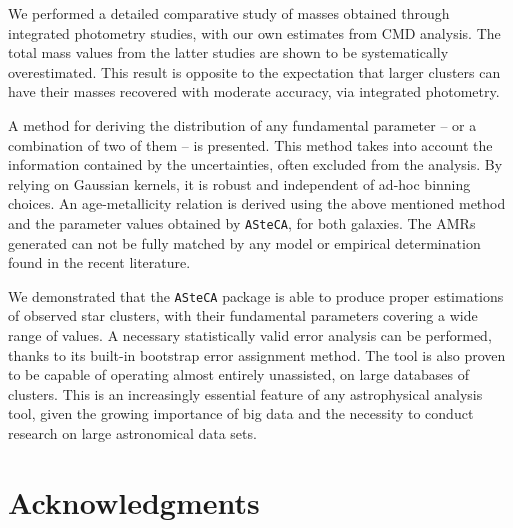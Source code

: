 \documentclass[a4paper,fleqn,usenatbib]{mnras}
\begin{document}
We performed a detailed comparative study of masses obtained through integrated
photometry studies, with our own estimates from CMD analysis. The total mass
values from the latter studies are shown to be systematically overestimated.
This result is opposite to the expectation that larger clusters can have their
masses recovered with moderate accuracy, via integrated photometry.

A method for deriving the distribution of any fundamental parameter -- or a
combination of two of them -- is presented. This method takes into account the
information contained by the uncertainties, often excluded from the analysis.
By relying on Gaussian kernels, it is robust and independent of ad-hoc binning
choices.
%
An age-metallicity relation is derived using the above mentioned method and the
parameter values obtained by \texttt{ASteCA}, for both galaxies. The AMRs
generated can not be fully matched by any model or empirical determination found
in the recent literature.

We demonstrated that the \texttt{ASteCA} package is able to produce proper
estimations of observed star clusters, with their fundamental parameters
covering a wide range of values. A necessary statistically valid error analysis
can be performed, thanks to its built-in bootstrap error assignment method.
%
The tool is also proven to be capable of operating almost entirely unassisted,
on large databases of clusters. This is an increasingly essential feature
of any astrophysical analysis tool, given the growing importance of big data and
the necessity to conduct research on large astronomical data sets.





\section*{Acknowledgments}
\end{document}
